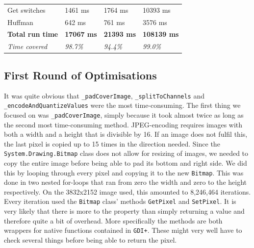 \begin{table}[H]
\begin{tabular}{@{}llll@{}}
		Get switches            & 1461 ms                                                                                   & 1764 ms                                                                                    & 10393 ms                                                                                \\
		Huffman                 & 642 ms                                                                                    & 761 ms                                                                                     & 3576 ms                                                                                 \\ \midrule
		\textbf{Total run time} & \textbf{17067 ms}                                                                         & \textbf{21393 ms}                                                                          & \textbf{108139 ms}                                                                      \\
		\textit{Time covered}   & \textit{98.7\%}                                                                           & \textit{94.4\%}                                                                            & \textit{99.0\%}                                                                         \\ \bottomrule
	\end{tabular}
\end{table}

\subsection{First Round of Optimisations}
It was quite obvious that \lstinline|_padCoverImage|, \lstinline|_splitToChannels| and \lstinline|_encodeAndQuantizeValues| were the most time-consuming.
The first thing we focused on was \lstinline|_padCoverImage|, simply because it took almost twice as long as the second most time-consuming method.
JPEG-encoding requires images with both a width and a height that is divisible by 16.
If an image does not fulfil this, the last pixel is copied up to 15 times in the direction needed.
Since the \lstinline|System.Drawing.Bitmap| class does not allow for resizing of images, we needed to copy the entire image before being able to pad its bottom and right side.
We did this by looping through every pixel and copying it to the new \lstinline|Bitmap|.
This was done in two nested for-loops that ran from zero the width and zero to the height respectively.
On the 3832x2152 image used, this amounted to 8,246,464 iterations.
Every iteration used the \lstinline|Bitmap| class' methods \lstinline|GetPixel| and \lstinline|SetPixel|.
It is very likely that there is more to the property than simply returning a value and therefore quite a bit of overhead.
More specifically the methods are both wrappers for native functions contained in \lstinline|GDI+|. 
These might very well have to check several things before being able to return the pixel.

